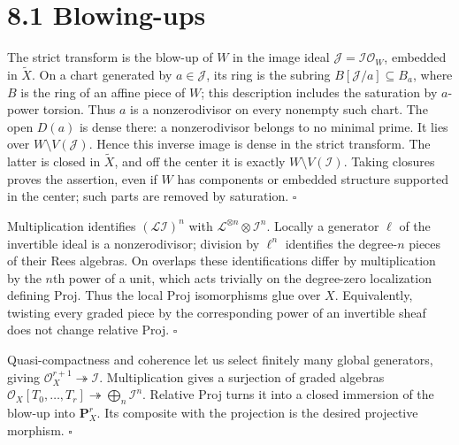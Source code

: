 \documentclass[11pt]{article}
\let\chapterexercise\exercise
\renewcommand{\exercise}[2]{\Needspace{8\baselineskip}\chapterexercise{#1}{#2}}
\begin{document}
\section*{8.1 Blowing-ups}

\pf
The strict transform is the blow-up of $W$ in the image ideal $\mathcal J=\mathcal I\mathcal O_W$, embedded in $\widetilde X$. On a chart generated by $a\in\mathcal J$, its ring is the subring $B[\mathcal J/a]\subseteq B_a$, where $B$ is the ring of an affine piece of $W$; this description includes the saturation by $a$-power torsion. Thus $a$ is a nonzerodivisor on every nonempty such chart. The open $D(a)$ is dense there: a nonzerodivisor belongs to no minimal prime. It lies over $W\setminus V(\mathcal J)$. Hence this inverse image is dense in the strict transform. The latter is closed in $\widetilde X$, and off the center it is exactly $W\setminus V(\mathcal I)$. Taking closures proves the assertion, even if $W$ has components or embedded structure supported in the center; such parts are removed by saturation. \hfill$\square$

\pf
Multiplication identifies $(\mathcal L\mathcal I)^n$ with $\mathcal L^{\otimes n}\otimes\mathcal I^n$. Locally a generator $\ell$ of the invertible ideal is a nonzerodivisor; division by $\ell^n$ identifies the degree-$n$ pieces of their Rees algebras. On overlaps these identifications differ by multiplication by the $n$th power of a unit, which acts trivially on the degree-zero localization defining Proj. Thus the local Proj isomorphisms glue over $X$. Equivalently, twisting every graded piece by the corresponding power of an invertible sheaf does not change relative Proj. \hfill$\square$

\pf
Quasi-compactness and coherence let us select finitely many global generators, giving $\mathcal O_X^{r+1}\twoheadrightarrow\mathcal I$. Multiplication gives a surjection of graded algebras $\mathcal O_X[T_0,\ldots,T_r]\twoheadrightarrow\bigoplus_n\mathcal I^n$. Relative Proj turns it into a closed immersion of the blow-up into $\mathbf P^r_X$. Its composite with the projection is the desired projective morphism. \hfill$\square$
\end{document}
